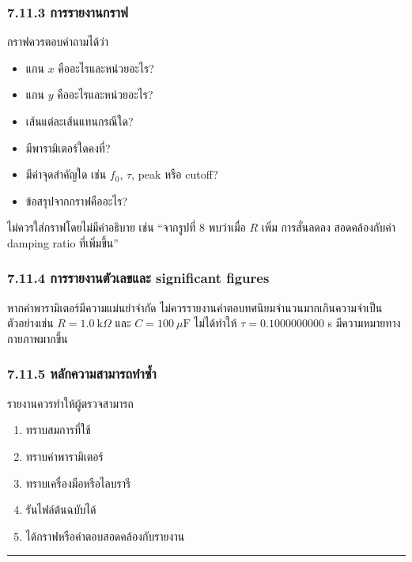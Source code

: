 \subsubsection{7.11.3 การรายงานกราฟ}

กราฟควรตอบคำถามได้ว่า

\begin{itemize}
    \item แกน $x$ คืออะไรและหน่วยอะไร?
    \item แกน $y$ คืออะไรและหน่วยอะไร?
    \item เส้นแต่ละเส้นแทนกรณีใด?
    \item มีพารามิเตอร์ใดคงที่?
    \item มีค่าจุดสำคัญใด เช่น $f_0$, $\tau$, peak หรือ cutoff?
    \item ข้อสรุปจากกราฟคืออะไร?
\end{itemize}

ไม่ควรใส่กราฟโดยไม่มีคำอธิบาย เช่น “จากรูปที่ 8 พบว่าเมื่อ $R$ เพิ่ม การสั่นลดลง สอดคล้องกับค่า damping ratio ที่เพิ่มขึ้น”

\subsubsection{7.11.4 การรายงานตัวเลขและ significant figures}

หากค่าพารามิเตอร์มีความแม่นยำจำกัด ไม่ควรรายงานคำตอบทศนิยมจำนวนมากเกินความจำเป็น ตัวอย่างเช่น $R=1.0\ \text{k}\Omega$ และ $C=100\ \mu\text{F}$ ไม่ได้ทำให้ $\tau=0.1000000000$ s มีความหมายทางกายภาพมากขึ้น

\subsubsection{7.11.5 หลักความสามารถทำซ้ำ}

รายงานควรทำให้ผู้ตรวจสามารถ

\begin{enumerate}
    \item ทราบสมการที่ใช้
    \item ทราบค่าพารามิเตอร์
    \item ทราบเครื่องมือหรือไลบรารี
    \item รันไฟล์ต้นฉบับได้
    \item ได้กราฟหรือคำตอบสอดคล้องกับรายงาน
\end{enumerate}

\par\noindent\rule{\textwidth}{0.4pt}\par

